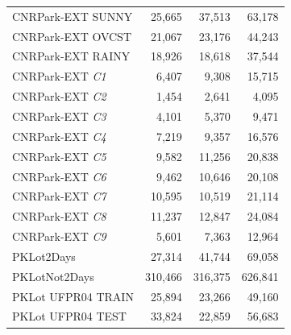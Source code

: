 \begin{table}
\begin{tabularx}{\linewidth}{lRRR}
\midrule
     CNRPark-EXT SUNNY     & 25,665         & 37,513         & 63,178          \\
     CNRPark-EXT OVCST     & 21,067         & 23,176         & 44,243          \\
     CNRPark-EXT RAINY     & 18,926         & 18,618         & 37,544          \\ %
\midrule
     CNRPark-EXT \emph{C1}      & 6,407          & 9,308          & 15,715          \\
     CNRPark-EXT \emph{C2}       & 1,454          & 2,641          & 4,095           \\
     CNRPark-EXT \emph{C3}       & 4,101          & 5,370          & 9,471           \\
     CNRPark-EXT \emph{C4}       & 7,219          & 9,357          & 16,576          \\
     CNRPark-EXT \emph{C5}       & 9,582          & 11,256         & 20,838          \\
     CNRPark-EXT \emph{C6}       & 9,462          & 10,646         & 20,108          \\
     CNRPark-EXT \emph{C7}       & 10,595         & 10,519         & 21,114          \\
     CNRPark-EXT \emph{C8}       & 11,237         & 12,847         & 24,084          \\
     CNRPark-EXT \emph{C9}       & 5,601          & 7,363          & 12,964          \\ %
\midrule
     PKLot2Days        & 27,314         & 41,744         & 69,058          \\
     PKLotNot2Days     & 310,466        & 316,375        & 626,841         \\ %
\midrule
     PKLot UFPR04 TRAIN& 25,894         & 23,266         & 49,160          \\
     PKLot UFPR04 TEST & 33,824         & 22,859         & 56,683          \\

\end{tabularx}
\end{table}
